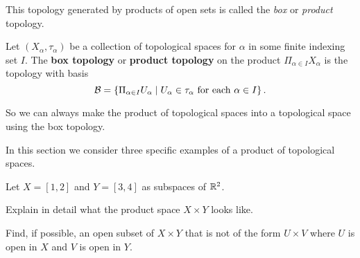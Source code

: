 This topology generated by products of open sets is called the \emph{box} or \emph{product} topology.

\begin{definition} \label{def:box_topology} Let $(X_{\alpha}, \tau_{\alpha})$ be a collection of topological spaces for $\alpha$ in some finite indexing set $I$. The \textbf{box topology} or \textbf{product topology} on the product $\Pi_{\alpha \in I} X_{\alpha}$ is the topology with basis
\[\mathcal{B} = \left\{ \Pi_{\alpha \in I} U_{\alpha} \mid U_{\alpha} \in \tau_{\alpha}  \text{ for each } \alpha \in I \right\}.\]
\end{definition}

So we can always make the product of topological spaces into a topological space using the box topology. 

\label{sec_prod_top_exam}

In this section we consider three specific examples of a product of topological spaces. 

\begin{activity} Let $X = [1,2]$ and $Y = [3,4]$ as subspaces of $\mathbb{R}^2$. 
\ba
\item Explain in detail what the product space $X \times Y$ looks like. 

\item Find, if possible, an open subset of $X \times Y$ that is not of the form $U \times V$ where $U$ is open in $X$ and $V$ is open in $Y$.

\ea

\end{activity}

\begin{comment}

\ActivitySolution

\ba
\item The product space $X \times Y$ contains all points of the form $(x,y)$ with $1 \leq x \leq 2$ and $3 \leq y \leq 4$ in $\R^2$. This set of points is the rectangle in $\R^2$ with vertices $(1,3)$, $(2,3)$, $(1,4)$ and $(2,4)$. 

\item The set $O = \{(x,y) \mid 1.1 < x < 1.3, 3.1 < y < 3.3\} \cup \{(x,y) \mid 1.7< x < 1.9, 3.7 < y < 3.9\}$ is equal to $(B(1.2,0.1) \times B(3.2,0.1)) \cup ((B(1.8,0.1) \times B(3.8,0.1))$ and so is open in $X \times Y$. However, $O$ is not of the form $U \times V$ where $U$ is open in $X$ and $V$ is open in $Y$. To see why, suppose to the contrary that $O = U \times V$ for some $U$ open in $X$ and $V$ open in $Y$. Since the points $(x,y)$ in $O$ only have $x \in (1.1,1.3) \cup (1.7,1.9)$ and $y \in (3.1,3.3) \cup (3.7,3.9)$, it follows that $U = (1,1,1.3) \cup (1.7,1.9)$ and $V = (3.1,3.3) \cup (3.7,3.9)$. But then $(1.8, 3.2)$ is in $U \times V$. Since $(1.8, 3.2)$ is not in $O$, we conclude that $O$ is not of the for $U \times V$ with $U$ open in $X$ and $V$ open in $Y$.  

\ea


\end{comment}



